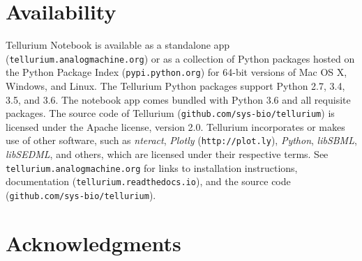 \documentclass[10pt,letterpaper]{article}
\begin{document}




\section*{Availability}

Tellurium Notebook is available as a standalone app (\texttt{tellurium.analogmachine.org}) or as a collection of Python packages hosted on the Python Package Index (\texttt{pypi.python.org}) for 64-bit versions of Mac OS X, Windows, and Linux. The Tellurium Python packages support Python 2.7, 3.4, 3.5, and 3.6. The notebook app comes bundled with Python 3.6 and all requisite packages. The source code of Tellurium (\texttt{github.com/sys-bio/tellurium}) is licensed under the Apache license, version 2.0. Tellurium incorporates or makes use of other software, such as \textit{nteract}, \textit{Plotly} (\texttt{http://plot.ly}), \textit{Python}, \textit{libSBML}, \textit{libSEDML}, and others, which are licensed under their respective terms. See \texttt{tellurium.analogmachine.org} for links to installation instructions, documentation (\texttt{tellurium.readthedocs.io}), and the source code (\texttt{github.com/sys-bio/tellurium}).

\section*{Acknowledgments}
\end{document}
